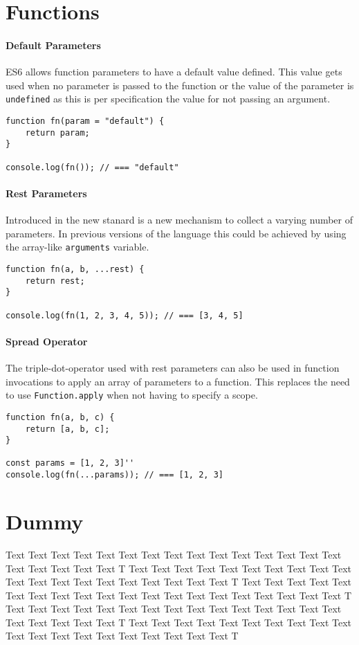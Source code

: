 \documentclass{bioinfo}
\begin{document}
\section{Functions}
\paragraph{Default Parameters\textcolon}
ES6 allows function parameters to have a default value defined. This value gets used when
no parameter is passed to the function or the value of the parameter is {\tt undefined} as
this is per specification the value for not passing an argument.

\begin{lstlisting}
function fn(param = "default") {
    return param;
}

console.log(fn()); // === "default"
\end{lstlisting}

\paragraph{Rest Parameters}
Introduced in the new stanard is a new mechanism to collect a varying number of parameters.
In previous versions of the language this could be achieved by using the array-like
{\tt arguments} variable.

\begin{lstlisting}
function fn(a, b, ...rest) {
    return rest;
}

console.log(fn(1, 2, 3, 4, 5)); // === [3, 4, 5]
\end{lstlisting}

\paragraph{Spread Operator}
The triple-dot-operator used with rest parameters can also be used in function invocations
to apply an array of parameters to a function. This replaces the need to use {\tt Function.apply}
when not having to specify a scope.

\begin{lstlisting}
function fn(a, b, c) {
    return [a, b, c];
}

const params = [1, 2, 3]''
console.log(fn(...params)); // === [1, 2, 3]
\end{lstlisting}


\section{Dummy}
Text Text Text Text Text Text  Text Text Text Text Text Text Text Text Text  Text Text Text Text Text T
Text Text Text Text Text Text  Text Text Text Text Text Text Text Text Text  Text Text Text Text Text T
Text Text Text Text Text Text  Text Text Text Text Text Text Text Text Text  Text Text Text Text Text T
Text Text Text Text Text Text  Text Text Text Text Text Text Text Text Text  Text Text Text Text Text T
Text Text Text Text Text Text  Text Text Text Text Text Text Text Text Text  Text Text Text Text Text T
\end{document}
